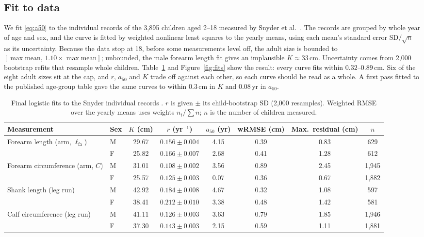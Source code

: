 \documentclass[11pt]{article}
\newcommand{\lfa}{\ell_{\mathrm{fa}}}
\theoremstyle{definition}
\begin{document}
\subsection{Fit to data}
\label{sec:fits}
We fit \eqref{eq:a50} to the individual records of the 3,895 children aged 2--18 measured by Snyder et al.\ \cite{snyder1977,anthrokids}. The records are grouped by whole year of age and sex, and the curve is fitted by weighted nonlinear least squares to the yearly means, using each mean's standard error SD$/\sqrt{n}$ as its uncertainty. Because the data stop at 18, before some measurements level off, the adult size is bounded to $[\max\text{mean},\,1.10\times\max\text{mean}]$; unbounded, the male forearm length fit gives an implausible $K\approx33$\,cm. Uncertainty comes from 2,000 bootstrap refits that resample whole children. Table~\ref{tab:fits} and Figure~\ref{fig:fits} show the result: every curve fits within $0.32$--$0.89$\,cm. Six of the eight adult sizes sit at the cap, and $r$, $a_{50}$ and $K$ trade off against each other, so each curve should be read as a whole. A first pass fitted to the published age-group table gave the same curves to within 0.3\,cm in $K$ and 0.08\,yr in $a_{50}$.

\begin{table}[htbp]
\centering\small
\caption{Final logistic fits to the Snyder individual records \cite{snyder1977,anthrokids}. $r$ is given $\pm$ its child-bootstrap SD (2,000 resamples). Weighted RMSE over the yearly means uses weights $n_i/\sum n$; $n$ is the number of children measured.}
\label{tab:fits}
\setlength{\tabcolsep}{4pt}
\begin{tabular}{@{}llcccccc@{}}
\toprule
Measurement & Sex & $K$ (cm) & $r$ (yr$^{-1}$) & $a_{50}$ (yr) & wRMSE (cm) & Max.\ residual (cm) & $n$\\
\midrule
\multirow{2}{*}{Forearm length (arm, $\lfa$)} & M & 29.67 & $0.156\pm0.004$ & 4.15 & 0.39 & 0.83 & 629\\
 & F & 25.82 & $0.166\pm0.007$ & 2.68 & 0.41 & 1.28 & 612\\
\multirow{2}{*}{Forearm circumference (arm, $C$)} & M & 31.01 & $0.108\pm0.002$ & 3.56 & 0.89 & 2.45 & 1,945\\
 & F & 25.57 & $0.125\pm0.003$ & 0.07 & 0.36 & 0.67 & 1,882\\
\multirow{2}{*}{Shank length (leg run)} & M & 42.92 & $0.184\pm0.008$ & 4.67 & 0.32 & 1.08 & 597\\
 & F & 38.41 & $0.212\pm0.010$ & 3.38 & 0.48 & 1.42 & 581\\
\multirow{2}{*}{Calf circumference (leg run)} & M & 41.11 & $0.126\pm0.003$ & 3.63 & 0.79 & 1.85 & 1,946\\
 & F & 37.30 & $0.143\pm0.003$ & 2.15 & 0.59 & 1.11 & 1,881\\
\bottomrule
\end{tabular}
\end{table}
\end{document}
